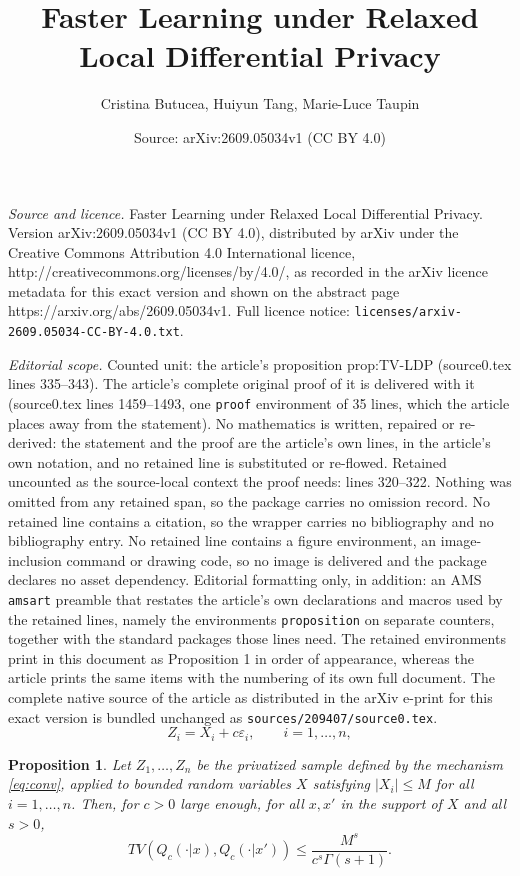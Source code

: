 \documentclass[10pt,a4paper]{amsart}
\title{Faster Learning under Relaxed Local Differential Privacy}
\author{Cristina Butucea, Huiyun Tang, Marie-Luce Taupin}
\date{Source: arXiv:2609.05034v1 (CC BY 4.0)}
\newtheorem{proposition}{Proposition}
\begin{document}
\maketitle

\noindent\emph{Source and licence.} Faster Learning under Relaxed Local Differential Privacy. Version arXiv:2609.05034v1 (CC BY 4.0), distributed by arXiv under the Creative Commons Attribution 4.0 International licence, http://creativecommons.org/licenses/by/4.0/, as recorded in the arXiv licence metadata for this exact version and shown on the abstract page https://arxiv.org/abs/2609.05034v1. Full licence notice: \texttt{licenses/arxiv-2609.05034-CC-BY-4.0.txt}.\par\smallskip

\noindent\textit{Editorial scope.} Counted unit: the article's proposition prop:TV-LDP (source0.tex lines 335--343). The article's complete original proof of it is delivered with it (source0.tex lines 1459--1493, one \texttt{proof} environment of 35 lines, which the article places away from the statement). No mathematics is written, repaired or re-derived: the statement and the proof are the article's own lines, in the article's own notation, and no retained line is substituted or re-flowed.  Retained uncounted as the source-local context the proof needs: lines 320--322.  Nothing was omitted from any retained span, so the package carries no omission record.  No retained line contains a citation, so the wrapper carries no bibliography and no bibliography entry.  No retained line contains a figure environment, an image-inclusion command or drawing code, so no image is delivered and the package declares no asset dependency.  Editorial formatting only, in addition: an AMS \texttt{amsart} preamble that restates the article's own declarations and macros used by the retained lines, namely the environments \texttt{proposition} on separate counters, together with the standard packages those lines need.  The retained environments print in this document as Proposition 1 in order of appearance, whereas the article prints the same items with the numbering of its own full document.  The complete native source of the article as distributed in the arXiv e-print for this exact version is bundled unchanged as \texttt{sources/209407/source0.tex}.
	\begin{equation}\label{eq:conv}
		Z_i = X_i + c \varepsilon_i, \qquad i=1,\ldots,n,
	\end{equation}

\begin{proposition}\label{prop:TV-LDP}
	Let $Z_1,\ldots,Z_n$ be the privatized sample defined by the mechanism 
	\eqref{eq:conv}, applied to bounded random variables $X$ satisfying 
	$|X_i|\le M$ for all $i=1,\ldots,n$. Then, for $c>0$ large enough, for all $x,x'$ in the support of $X$ and all $s>0$,
	\begin{equation*}
	TV(Q_c(\cdot|x),Q_c(\cdot|x')) \le \frac{M^s}{c^s \Gamma(s+1)}.
	\end{equation*}
    \end{proposition}
\end{document}
